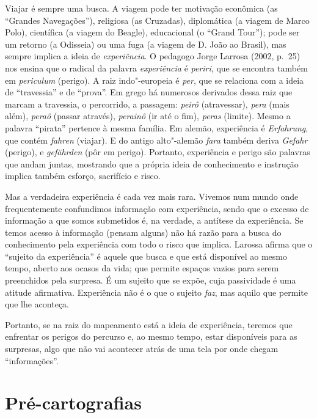 Viajar é sempre uma busca. A viagem pode ter motivação econômica (as
``Grandes Navegações''), religiosa (as Cruzadas), diplomática (a viagem
de Marco Polo), científica (a viagem do Beagle), educacional (o ``Grand
Tour''); pode ser um retorno (a Odisseia) ou uma fuga (a viagem de D.
João  ao Brasil), mas sempre implica a ideia de \emph{experiência}. O
pedagogo Jorge Larrosa (2002, p.~25) nos ensina que o radical da palavra
\emph{experiência} é \emph{periri}, que se encontra também em
\emph{periculum} (perigo). A raiz indo"-europeia é \emph{per}, que se
relaciona com a ideia de ``travessia'' e de ``prova''. Em grego há
numerosos derivados dessa raiz que marcam a travessia, o percorrido, a
passagem: \emph{peirô} (atravessar), \emph{pera} (mais além),
\emph{peraô} (passar através), \emph{perainô} (ir até o fim),
\emph{peras} (limite). Mesmo a palavra ``pirata'' pertence à mesma
família. Em alemão, experiência é \emph{Erfahrung}, que contém
\emph{fahren} (viajar). E do antigo alto"-alemão \emph{fara} também
deriva \emph{Gefahr} (perigo), e \emph{gefährden} (pôr em perigo).
Portanto, experiência e perigo são palavras que andam juntas, mostrando
que a própria ideia de conhecimento e instrução implica também
esforço, sacrifício e risco.

Mas a verdadeira experiência é cada vez mais rara. Vivemos num mundo
onde frequentemente confundimos informação com experiência, sendo que o
excesso de informação a que somos submetidos é, na verdade, a antítese
da experiência. Se temos acesso à informação (pensam alguns) não há razão para a busca do conhecimento pela experiência com todo o risco que implica. Larossa afirma que o ``sujeito da experiência'' é aquele
que busca e que está disponível ao mesmo tempo, aberto aos ocasos da
vida; que permite espaços vazios para serem preenchidos pela surpresa. É
um sujeito que se expõe, cuja passividade é uma atitude afirmativa.
Experiência não é o que o sujeito \emph{faz}, mas aquilo que permite que
lhe aconteça.

Portanto, se na raiz do mapeamento está a ideia de experiência, teremos
que enfrentar os perigos do percurso e, ao mesmo tempo, estar
disponíveis para as surpresas, algo que não vai acontecer atrás de uma
tela por onde chegam ``informações''.

\chapter{Pré-cartografias}


